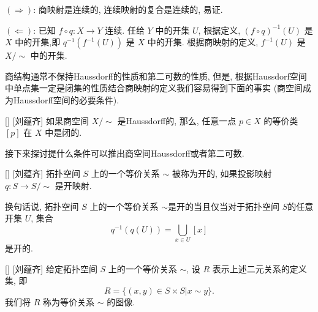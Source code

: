\documentclass[UTF8]{ctexart}
\begin{document}
        \begin{prf}
             \((\Rightarrow)\): 商映射是连续的, 连续映射的复合是连续的, 易证. 

             \((\Leftarrow)\): 已知 \(f \circ q: X \rightarrow Y\) 连续. 任给 \(Y\) 中的开集 \(U\), 根据定义, \({(f \circ q)}^{-1}(U)\) 是 \(X\) 中的开集,即 \(q^{-1}(f^{-1}(U))\) 是 \(X\) 中的开集. 根据商映射的定义,  \(f^{-1}(U)\) 是 \(X/\sim\) 中的开集. 
        \end{prf}

        \vspace{10pt}
        
        商结构通常不保持Haussdorff的性质和第二可数的性质, 但是, 根据Haussdorf空间中单点集一定是闭集的性质结合商映射的定义我们容易得到下面的事实 (商空间成为Haussdorff空间的必要条件). 

        \begin{ppt}
            []
            {}
            []
            [刘蕴齐]
            如果商空间 \(X / \sim\) 是Haussdorff的, 那么, 任意一点 \(p \in X\) 的等价类 \([p]\) 在 \(X\) 中是闭的. 
        \end{ppt}

        \vspace{10pt}
        
        接下来探讨提什么条件可以推出商空间Haussdorff或者第二可数. 

        \begin{dfn}
            []
            {}
            []
            [刘蕴齐]
            拓扑空间 \( S \) 上的一个等价关系 \( \sim \) 被称为开的, 如果投影映射 \( q: S \to S/\sim \) 是开映射. 
        \end{dfn}

        \begin{rmk}
            []
            换句话说, 拓扑空间 \( S \) 上的一个等价关系 \( \sim \)是开的当且仅当对于拓扑空间 \( S \)的任意开集 \(U\), 集合
            \[
                q^{-1}(q(U)) = \bigcup_{x \in U} [x]
            \]
            是开的. 
        \end{rmk}

        \begin{dfn}
            []
            {}
            []
            [刘蕴齐]
            给定拓扑空间 \( S \) 上的一个等价关系 \( \sim \), 设 \(R\) 表示上述二元关系的定义集, 即
            \[
                R = \{(x,y) \in S \times S | x \sim y\}.
            \]
            我们将 \(R\) 称为等价关系 \(\sim\) 的图像. 
        \end{dfn}
\end{document}
